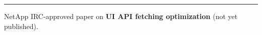 {\par}\vspace{-8pt}
\noindent\rule{\linewidth}{0.4pt}

\begin{resumeitemize}
    \item NetApp IRC-approved paper on \textbf{UI API fetching optimization} (not yet published).
\end{resumeitemize}
